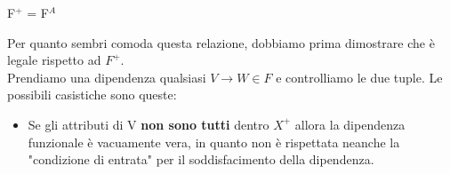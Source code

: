 \documentclass[12pt]{report}
\newcommand{\ra}{
	\rightarrow
}
\begin{document}
\begin{dimostrazione}{F$^+$ = F$^A$}{}
\begin{center}
		\end{center}
		Per quanto sembri comoda questa relazione, dobbiamo prima dimostrare che è legale rispetto ad $F^+$.\\
		Prendiamo una dipendenza qualsiasi $V \ra W \in F$ e controlliamo le due tuple. Le possibili casistiche sono queste:
		\begin{itemize}
			\item Se gli attributi di V \textbf{non sono tutti} dentro $X^+$ allora la dipendenza funzionale è vacuamente vera, in quanto non è rispettata neanche la "condizione di entrata" per il soddisfacimento della dipendenza.
			

\end{itemize}
\end{dimostrazione}
\end{document}
